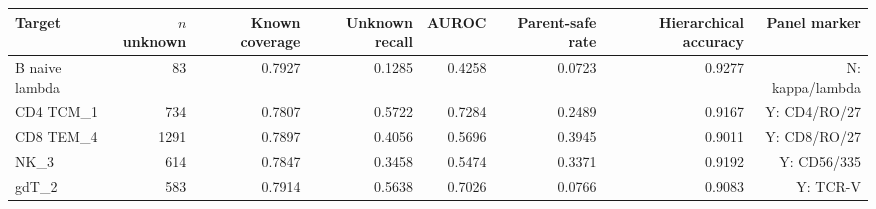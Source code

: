 \begin{tabular}{lrrrrrrr}
\toprule
Target & $n$ unknown & Known coverage & Unknown recall & AUROC & Parent-safe rate & Hierarchical accuracy & Panel marker \\
\midrule
B naive lambda & 83 & 0.7927 & 0.1285 & 0.4258 & 0.0723 & 0.9277 & N: kappa/lambda \\
CD4 TCM\_1 & 734 & 0.7807 & 0.5722 & 0.7284 & 0.2489 & 0.9167 & Y: CD4/RO/27 \\
CD8 TEM\_4 & 1291 & 0.7897 & 0.4056 & 0.5696 & 0.3945 & 0.9011 & Y: CD8/RO/27 \\
NK\_3 & 614 & 0.7847 & 0.3458 & 0.5474 & 0.3371 & 0.9192 & Y: CD56/335 \\
gdT\_2 & 583 & 0.7914 & 0.5638 & 0.7026 & 0.0766 & 0.9083 & Y: TCR-V \\
\bottomrule
\end{tabular}
